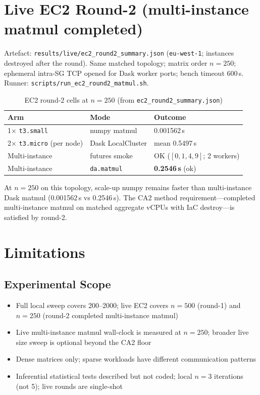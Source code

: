 \section{Live EC2 Round-2 (multi-instance matmul completed)}
\label{sec:live-ec2-round2}

Artefact: \texttt{results/live/ec2\_round2\_summary.json} (\texttt{eu-west-1}; instances destroyed after the round). Same matched topology; matrix order $n{=}250$; ephemeral intra-SG TCP opened for Dask worker ports; bench timeout 600\,s. Runner: \texttt{scripts/run\_ec2\_round2\_matmul.sh}.

\begin{table}[ht]
\centering
\caption{EC2 round-2 cells at $n{=}250$ (from \texttt{ec2\_round2\_summary.json})}
\label{tab:ec2-round2}
\begin{tabular}{lll}
\toprule
\textbf{Arm} & \textbf{Mode} & \textbf{Outcome} \\
\midrule
1× \texttt{t3.small} & numpy matmul & 0.001562\,s \\
2× \texttt{t3.micro} (per node) & Dask LocalCluster & mean 0.5497\,s \\
Multi-instance & futures smoke & OK ($[0,1,4,9]$; 2 workers) \\
Multi-instance & \texttt{da.matmul} & \textbf{0.2546\,s} (ok) \\
\bottomrule
\end{tabular}
\end{table}

At $n{=}250$ on this topology, scale-up numpy remains faster than multi-instance Dask matmul (0.001562\,s vs 0.2546\,s). The CA2 method requirement—completed multi-instance matmul on matched aggregate vCPUs with IaC destroy—is satisfied by round-2.

\section{Limitations}

\subsection{Experimental Scope}

\begin{itemize}
    \item Full local sweep covers 200--2000; live EC2 covers $n{=}500$ (round-1) and $n{=}250$ (round-2 completed multi-instance matmul)
    \item Live multi-instance matmul wall-clock is measured at $n{=}250$; broader live size sweep is optional beyond the CA2 floor
    \item Dense matrices only; sparse workloads have different communication patterns
    \item Inferential statistical tests described but not coded; local $n{=}3$ iterations (not 5); live rounds are single-shot
\end{itemize}

